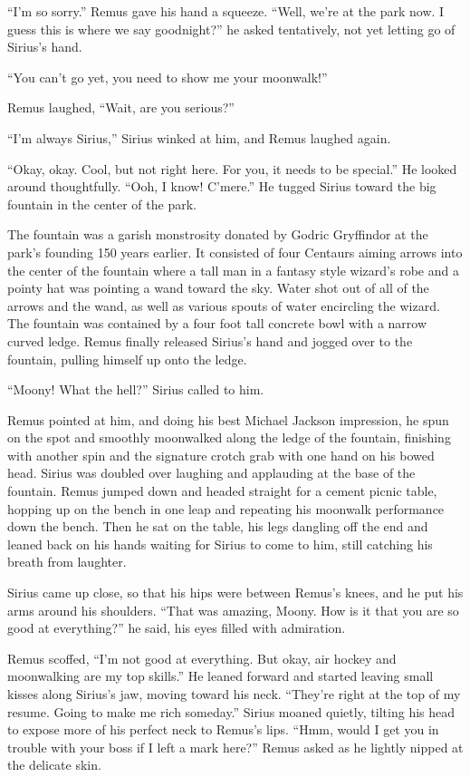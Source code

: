 \documentclass[12pt,twoside,openright]{memoir}
\begin{document}
``I'm so sorry.'' Remus gave his hand a squeeze. ``Well, we're at the park now. I guess this is where we say goodnight?'' he asked tentatively, not yet letting go of Sirius's hand.

``You can't go yet, you need to show me your moonwalk!''

Remus laughed, ``Wait, are you serious?''

``I'm always Sirius,'' Sirius winked at him, and Remus laughed again.

``Okay, okay. Cool, but not right here. For you, it needs to be special.'' He looked around thoughtfully. ``Ooh, I know! C'mere.'' He tugged Sirius toward the big fountain in the center of the park.

The fountain was a garish monstrosity donated by Godric Gryffindor at the park's founding 150 years earlier. It consisted of four Centaurs aiming arrows into the center of the fountain where a tall man in a fantasy style wizard's robe and a pointy hat was pointing a wand toward the sky. Water shot out of all of the arrows and the wand, as well as various spouts of water encircling the wizard. The fountain was contained by a four foot tall concrete bowl with a narrow curved ledge. Remus finally released Sirius's hand and jogged over to the fountain, pulling himself up onto the ledge.

``Moony! What the hell?'' Sirius called to him.

Remus pointed at him, and doing his best Michael Jackson impression, he spun on the spot and smoothly moonwalked along the ledge of the fountain, finishing with another spin and the signature crotch grab with one hand on his bowed head. Sirius was doubled over laughing and applauding at the base of the fountain. Remus jumped down and headed straight for a cement picnic table, hopping up on the bench in one leap and repeating his moonwalk performance down the bench. Then he sat on the table, his legs dangling off the end and leaned back on his hands waiting for Sirius to come to him, still catching his breath from laughter.

Sirius came up close, so that his hips were between Remus's knees, and he put his arms around his shoulders. ``That was amazing, Moony. How is it that you are so good at everything?'' he said, his eyes filled with admiration.

Remus scoffed, ``I'm not good at everything. But okay, air hockey and moonwalking are my top skills.'' He leaned forward and started leaving small kisses along Sirius's jaw, moving toward his neck. ``They're right at the top of my resume. Going to make me rich someday.'' Sirius moaned quietly, tilting his head to expose more of his perfect neck to Remus's lips. ``Hmm, would I get you in trouble with your boss if I left a mark here?'' Remus asked as he lightly nipped at the delicate skin.
\end{document}
